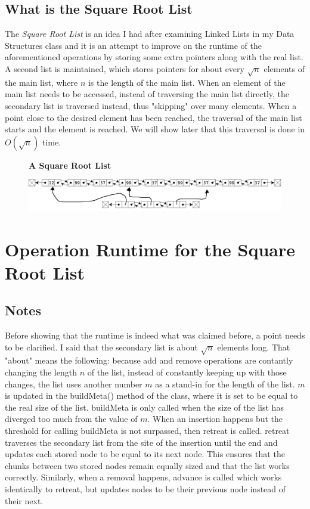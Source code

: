 \documentclass[10pt]{article}
\begin{document}
\subsection{What is the Square Root List}
The \textit{Square Root List} is an idea I had after examining Linked Lists in my Data Structures class and it is an attempt to improve on the runtime of the aforementioned operations by storing some extra pointers along with the real list. A second list is maintained, which stores pointers for about every $\sqrt{n}$ elements of the main list, where $n$ is the length of the main list. When an element of the main list needs to be accessed, instead of traversing the main list directly, the secondary list is traversed instead, thus "skipping" over many elements. When a point close to the desired element has been reached, the traversal of the main list starts and the element is reached. We will show later that this traversal is done in $O(\sqrt{n})$ time.
\begin{figure}[hbp]
	\centering
	\textbf{A Square Root List}\par\medskip
	\includegraphics[width=.7\textwidth]{./img/square_root_list.png}
\end{figure}
\section{Operation Runtime for the Square Root List}
\subsection{Notes}
Before showing that the runtime is indeed what was claimed before, a point needs to be clarified. I said that the secondary list is about $\sqrt{n}$ elements long. That "about" means the following: because add and remove operations are contantly changing the length $n$ of the list, instead of constantly keeping up with those changes, the list uses another number $m$ as a stand-in for the length of the list. $m$ is updated in the buildMeta() method of the class, where it is set to be equal to the real size of the list. buildMeta is only called when the size of the list has diverged too much from the value of $m$. When an insertion happens but the threshold for calling buildMeta is not surpassed, then retreat is called. retreat traverses the secondary list from the site of the insertion until the end and updates each stored node to be equal to its next node. This ensures that the chunks between two stored nodes remain equally sized and that the list works correctly. Similarly, when a removal happens, advance is called which works identically to retreat, but updates nodes to be their previous node instead of their next.
\end{document}
